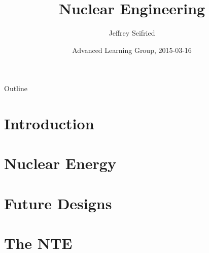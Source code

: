 \documentclass{beamer}
\title{Nuclear Engineering}
\author{Jeffrey Seifried}
\institute{Ad Delivery Team, Yelp}
\date{Advanced Learning Group, 2015-03-16 }
\begin{document}
\begin{frame}
  \titlepage
\end{frame}

\begin{frame}{Outline}
  \tableofcontents
\end{frame}


\section{Introduction}

\section{Nuclear Energy}

\section{Future Designs}

\section{The NTE}
\end{document}
